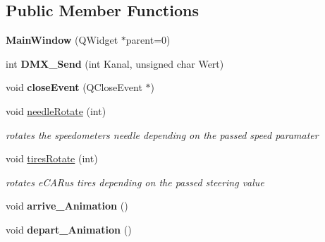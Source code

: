 \subsection*{Public Member Functions}
\begin{DoxyCompactItemize}
\item 
\hypertarget{class_main_window_a8b244be8b7b7db1b08de2a2acb9409db}{}{\bfseries Main\+Window} (Q\+Widget $\ast$parent=0)\label{class_main_window_a8b244be8b7b7db1b08de2a2acb9409db}

\item 
\hypertarget{class_main_window_a4e90dae9d28e99e1a2a708eaf881c485}{}int {\bfseries D\+M\+X\+\_\+\+Send} (int Kanal, unsigned char Wert)\label{class_main_window_a4e90dae9d28e99e1a2a708eaf881c485}

\item 
\hypertarget{class_main_window_a38edb88d43e844aca9d2e762c8706565}{}void {\bfseries close\+Event} (Q\+Close\+Event $\ast$)\label{class_main_window_a38edb88d43e844aca9d2e762c8706565}

\item 
\hypertarget{class_main_window_ac3b886aa8279a5f084d3568b35bdbeb2}{}void \hyperlink{class_main_window_ac3b886aa8279a5f084d3568b35bdbeb2}{needle\+Rotate} (int)\label{class_main_window_ac3b886aa8279a5f084d3568b35bdbeb2}

\begin{DoxyCompactList}\small\item\em rotates the speedometer\textquotesingle{}s needle depending on the passed speed paramater \end{DoxyCompactList}\item 
\hypertarget{class_main_window_a23b80f82a61cc0a1e3e2721891c782b8}{}void \hyperlink{class_main_window_a23b80f82a61cc0a1e3e2721891c782b8}{tires\+Rotate} (int)\label{class_main_window_a23b80f82a61cc0a1e3e2721891c782b8}

\begin{DoxyCompactList}\small\item\em rotates e\+C\+A\+Rus\textquotesingle{} tires depending on the passed steering value \end{DoxyCompactList}\item 
\hypertarget{class_main_window_a0e5b89d0f15feab33a7c1fb56b398297}{}void {\bfseries arrive\+\_\+\+Animation} ()\label{class_main_window_a0e5b89d0f15feab33a7c1fb56b398297}

\item 
\hypertarget{class_main_window_a0045f76b77a2fda750ce2bd30f8a0a59}{}void {\bfseries depart\+\_\+\+Animation} ()\label{class_main_window_a0045f76b77a2fda750ce2bd30f8a0a59}

\end{DoxyCompactItemize}
